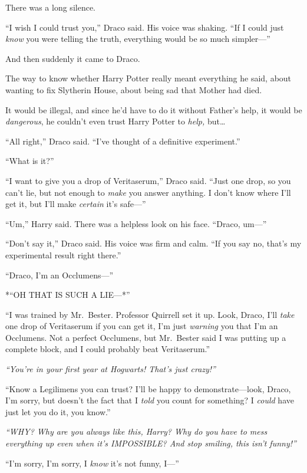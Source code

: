 There was a long silence.

``I wish I could trust you,'' Draco said. His voice was shaking. ``If I
could just \emph{know} you were telling the truth, everything would be
so much simpler---''

And then suddenly it came to Draco.

The way to know whether Harry Potter really meant everything he said,
about wanting to fix Slytherin House, about being sad that Mother had
died.

It would be illegal, and since he'd have to do it without Father's help,
it would be \emph{dangerous}, he couldn't even trust Harry Potter to
\emph{help,} but\ldots{}

``All right,'' Draco said. ``I've thought of a definitive experiment.''

``What is it?''

``I want to give you a drop of Veritaserum,'' Draco said. ``Just one
drop, so you can't lie, but not enough to \emph{make} you answer
anything. I don't know where I'll get it, but I'll make \emph{certain}
it's safe---''

``Um,'' Harry said. There was a helpless look on his face. ``Draco,
um---''

``Don't say it,'' Draco said. His voice was firm and calm. ``If you say
no, that's my experimental result right there.''

``Draco, I'm an Occlumens---''

*``OH THAT IS SUCH A LIE---*''

``I was trained by Mr.~Bester. Professor Quirrell set it up. Look,
Draco, I'll \emph{take} one drop of Veritaserum if you can get it, I'm
just \emph{warning} you that I'm an Occlumens. Not a perfect Occlumens,
but Mr.~Bester said I was putting up a complete block, and I could
probably beat Veritaserum.''

\emph{``You're in your first year at Hogwarts! That's just crazy!''}

``Know a Legilimens you can trust? I'll be happy to demonstrate---look,
Draco, I'm sorry, but doesn't the fact that I \emph{told} you count for
something? I \emph{could} have just let you do it, you know.''

\emph{``WHY? Why are you always like this, Harry? Why do you have to
mess everything up even when it's IMPOSSIBLE? And stop smiling, this
isn't funny!''}

``I'm sorry, I'm sorry, I \emph{know} it's not funny, I---''

